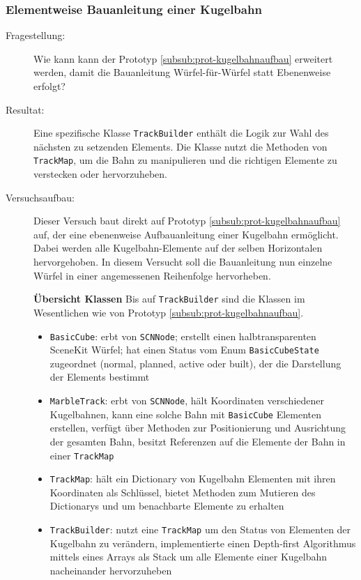\subsubsection{Elementweise Bauanleitung einer Kugelbahn}\label{subsub:prot-kugelbahnaufbau2}
\begin{description}
	\item[Fragestellung:] Wie kann kann der Prototyp \ref{subsub:prot-kugelbahnaufbau} erweitert werden, damit die Bauanleitung Würfel-für-Würfel statt Ebenenweise erfolgt?
	\item[Resultat:] Eine spezifische Klasse \texttt{TrackBuilder} enthält die Logik zur Wahl des nächsten zu setzenden Elements. Die Klasse nutzt die Methoden von \texttt{TrackMap}, um die Bahn zu manipulieren und die richtigen Elemente zu verstecken oder hervorzuheben.
	\item[Versuchsaufbau:] Dieser Versuch baut direkt auf Prototyp \ref{subsub:prot-kugelbahnaufbau} auf, der eine ebenenweise Aufbauanleitung einer Kugelbahn ermöglicht. Dabei werden alle Kugelbahn-Elemente auf der selben Horizontalen hervorgehoben. In diesem Versucht soll die Bauanleitung nun einzelne Würfel in einer angemessenen Reihenfolge hervorheben.

	\textbf{Übersicht Klassen}
	Bis auf \texttt{TrackBuilder} sind die Klassen im Wesentlichen wie von Prototyp \ref{subsub:prot-kugelbahnaufbau}.
	\begin{itemize}
		\item \texttt{BasicCube}: erbt von \texttt{SCNNode}; erstellt einen halbtransparenten SceneKit Würfel; hat einen Status vom Enum \texttt{BasicCubeState} zugeordnet (normal, planned, active oder built), der die Darstellung der Elements bestimmt
		\item \texttt{MarbleTrack}: erbt von \texttt{SCNNode}, hält Koordinaten verschiedener Kugelbahnen, kann eine solche Bahn mit \texttt{BasicCube} Elementen erstellen, verfügt über Methoden zur Positionierung und Ausrichtung der gesamten Bahn, besitzt Referenzen auf die Elemente der Bahn in einer \texttt{TrackMap}
		\item \texttt{TrackMap}: hält ein Dictionary von Kugelbahn Elementen mit ihren Koordinaten als Schlüssel, bietet Methoden zum Mutieren des Dictionarys und um benachbarte Elemente zu erhalten
		\item \texttt{TrackBuilder}: nutzt eine \texttt{TrackMap} um den Status von Elementen der Kugelbahn zu verändern, implementierte einen Depth-first Algorithmus mittels eines Arrays als Stack um alle Elemente einer Kugelbahn nacheinander hervorzuheben
	\end{itemize}


\end{description}
